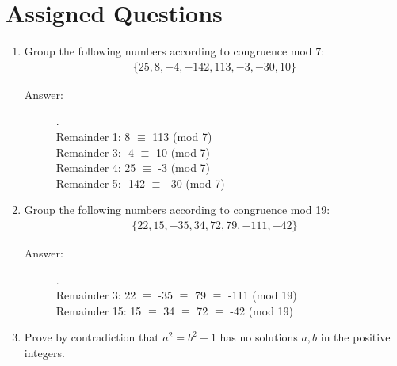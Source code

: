 \documentclass[12pt, oneside]{article}
\begin{document}
    \section*{Assigned Questions}
        \begin{enumerate}
        
            \item Group the following numbers according to congruence mod 7:
                \[
                \begin{array}{l}
                \{25,8, -4,-142,113,-3,-30, 10\}
                \end{array}
                \]

            \begin{description}
                \item[Answer:] .\\
                Remainder 1: 8 $\equiv$ 113 (mod 7)\\
                Remainder 3: -4 $\equiv$ 10 (mod 7)\\
                Remainder 4: 25 $\equiv$ -3 (mod 7)\\
                Remainder 5: -142 $\equiv$ -30 (mod 7)
            \end{description}
                
            \item Group the following numbers according to congruence mod 19:
                \[
                \begin{array}{l}
                \{22, 15, -35, 34, 72, 79, -111, -42\}
                \end{array}
                \]
                
            \begin{description}
                \item[Answer:] .\\
                Remainder 3: 22 $\equiv$ -35 $\equiv$ 79 $\equiv$ -111 (mod 19)\\
                Remainder 15: 15 $\equiv$ 34 $\equiv$ 72 $\equiv$ -42 (mod 19)
            \end{description}

            \item Prove by contradiction that $a^2=b^2+1$ has no  solutions $a,b$ in the positive integers.
            

\end{enumerate}
\end{document}
